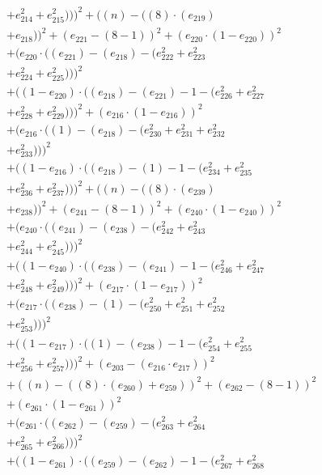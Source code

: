 \documentclass[10pt, a4paper]{article}
\begin{document}
\begin{align*}
& + e_{214}^{2} + e_{215}^{2})))^{2} + ((n) - ((8)  \cdot  (e_{219}) \\
& + e_{218}))^{2} + (e_{221} - (8 - 1))^{2} + (e_{220}  \cdot  (1 - e_{220}))^{2} \\
& + (e_{220}  \cdot  ((e_{221}) - (e_{218}) - (e_{222}^{2} + e_{223}^{2} \\
& + e_{224}^{2} + e_{225}^{2})))^{2} \\
& + ((1 - e_{220})  \cdot  ((e_{218}) - (e_{221}) - 1 - (e_{226}^{2} + e_{227}^{2} \\
& + e_{228}^{2} + e_{229}^{2})))^{2} + (e_{216}  \cdot  (1 - e_{216}))^{2} \\
& + (e_{216}  \cdot  ((1) - (e_{218}) - (e_{230}^{2} + e_{231}^{2} + e_{232}^{2} \\
& + e_{233}^{2})))^{2} \\
& + ((1 - e_{216})  \cdot  ((e_{218}) - (1) - 1 - (e_{234}^{2} + e_{235}^{2} \\
& + e_{236}^{2} + e_{237}^{2})))^{2} + ((n) - ((8)  \cdot  (e_{239}) \\
& + e_{238}))^{2} + (e_{241} - (8 - 1))^{2} + (e_{240}  \cdot  (1 - e_{240}))^{2} \\
& + (e_{240}  \cdot  ((e_{241}) - (e_{238}) - (e_{242}^{2} + e_{243}^{2} \\
& + e_{244}^{2} + e_{245}^{2})))^{2} \\
& + ((1 - e_{240})  \cdot  ((e_{238}) - (e_{241}) - 1 - (e_{246}^{2} + e_{247}^{2} \\
& + e_{248}^{2} + e_{249}^{2})))^{2} + (e_{217}  \cdot  (1 - e_{217}))^{2} \\
& + (e_{217}  \cdot  ((e_{238}) - (1) - (e_{250}^{2} + e_{251}^{2} + e_{252}^{2} \\
& + e_{253}^{2})))^{2} \\
& + ((1 - e_{217})  \cdot  ((1) - (e_{238}) - 1 - (e_{254}^{2} + e_{255}^{2} \\
& + e_{256}^{2} + e_{257}^{2})))^{2} + (e_{203} - (e_{216}  \cdot  e_{217}))^{2} \\
& + ((n) - ((8)  \cdot  (e_{260}) + e_{259}))^{2} + (e_{262} - (8 - 1))^{2} \\
& + (e_{261}  \cdot  (1 - e_{261}))^{2} \\
& + (e_{261}  \cdot  ((e_{262}) - (e_{259}) - (e_{263}^{2} + e_{264}^{2} \\
& + e_{265}^{2} + e_{266}^{2})))^{2} \\
& + ((1 - e_{261})  \cdot  ((e_{259}) - (e_{262}) - 1 - (e_{267}^{2} + e_{268}^{2} \\

\end{align*}
\end{document}
